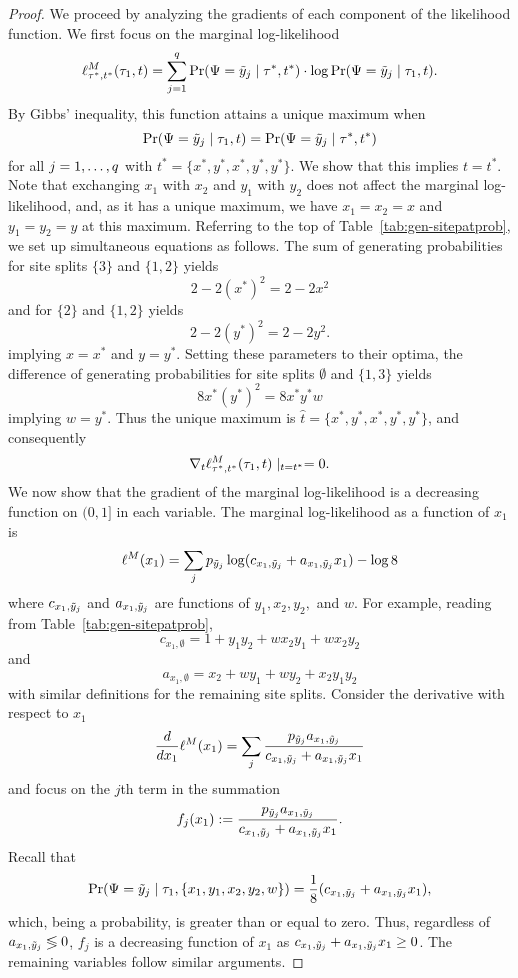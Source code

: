 \begin{proof}
We proceed by analyzing the gradients of each component of the likelihood function.
We first focus on the marginal log-likelihood
\[
\ell^M_{\tau^*,t^*}(\tau_1,t) = \sum_{j=1}^q \Pr(\Psi=\tilde{y}_j \mid \tau^*, t^*) \cdot \log \Pr(\Psi=\tilde{y}_j \mid \tau_1, t).
\]
By Gibbs' inequality, this function attains a unique maximum when
\[
\Pr(\Psi=\tilde{y}_j \mid \tau_1, t) = \Pr(\Psi=\tilde{y}_j \mid \tau^*, t^*)
\]
for all $j=1,\ldots,q$ with $t^*=\{x^*,y^*,x^*,y^*,y^*\}$.
We show that this implies $t=t^*$.
Note that exchanging $x_1$ with $x_2$ and $y_1$ with $y_2$ does not affect the marginal log-likelihood, and, as it has a unique maximum, we have $x_1=x_2=x$ and $y_1=y_2=y$ at this maximum.
Referring to the top of Table~\ref{tab:gen-sitepatprob}, we set up simultaneous equations as follows.
The sum of generating probabilities for site splits $\{3\}$ and $\{1,2\}$ yields
\[
2-2(x^*)^2 = 2-2x^2
\]
and for $\{2\}$ and $\{1,2\}$ yields
\[
2-2(y^*)^2 = 2-2y^2.
\]
implying $x=x^*$ and $y=y^*$.
Setting these parameters to their optima, the difference of generating probabilities for site splits $\emptyset$ and $\{1,3\}$ yields
\[
8x^*(y^*)^2 = 8x^*y^*w
\]
implying $w=y^*$.
Thus the unique maximum is $\hat{t}=\{x^*,y^*,x^*,y^*,y^*\}$, and consequently
\[
\nabla_t \ell^M_{\tau^*,t^*}(\tau_1,t) \mid_{t=t^*} = 0.
\]
We now show that the gradient of the marginal log-likelihood is a decreasing function on $(0,1]$ in each variable.
The marginal log-likelihood as a function of $x_1$ is
\begin{align*}
\ell^M(x_1) = \sum_j p_{\tilde{y}_j} \log(c_{x_1,\tilde{y}_j} + a_{x_1,\tilde{y}_j}x_1) - \log 8
\end{align*}
where $c_{x_1,\tilde{y}_j}$ and $a_{x_1,\tilde{y}_j}$ are functions of $y_1,x_2,y_2,$ and $w$.
For example, reading from Table~\ref{tab:gen-sitepatprob},
\[
c_{x_1,\emptyset} = 1+y_1y_2+wx_2y_1+wx_2y_2
\]
and
\[
a_{x_1,\emptyset} = x_2+wy_1+wy_2+x_2y_1y_2
\]
with similar definitions for the remaining site splits.
Consider the derivative with respect to $x_1$
\begin{align*}
\frac{d}{dx_1} \ell^M(x_1) = \sum_j \frac{p_{\tilde{y}_j}a_{x_1,\tilde{y}_j}}{c_{x_1,\tilde{y}_j} + a_{x_1,\tilde{y}_j}x_1}
\end{align*}
and focus on the $j$th term in the summation
\[
f_j(x_1) := \frac{p_{\tilde{y}_j}a_{x_1,\tilde{y}_j}}{c_{x_1,\tilde{y}_j} + a_{x_1,\tilde{y}_j}x_1}.
\]
Recall that
\[
\Pr(\Psi=\tilde{y}_j \mid \tau_1,\{x_1,y_1,x_2,y_2,w\}) = \frac{1}{8} (c_{x_1,\tilde{y}_j} + a_{x_1,\tilde{y}_j}x_1),
\]
which, being a probability, is greater than or equal to zero.
Thus, regardless of $a_{x_1,\tilde{y}_j} \lessgtr 0$, $f_j$ is a decreasing function of $x_1$ as $c_{x_1,\tilde{y}_j} + a_{x_1,\tilde{y}_j}x_1 \ge 0$.
The remaining variables follow similar arguments.


\end{proof}
